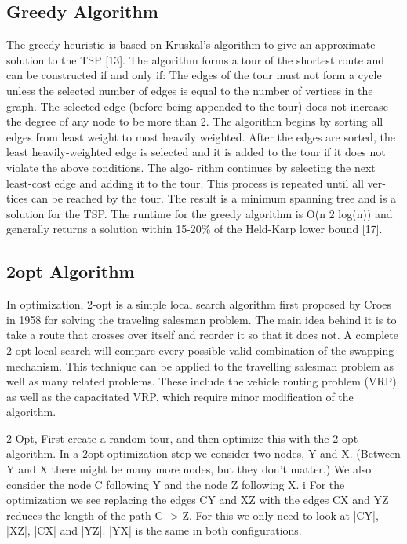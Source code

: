 \documentclass[10pt,twocolumn,letterpaper]{article}
\begin{document}
\subsection{Greedy Algorithm}
The greedy heuristic is based on Kruskal’s algorithm to
give an approximate solution to the TSP [13]. The algorithm
forms a tour of the shortest route and can be constructed if
and only if:
The edges of the tour must not form a cycle unless
the selected number of edges is equal to the number of
vertices in the graph.
The selected edge (before being appended to the tour)
does not increase the degree of any node to be more
than 2.
The algorithm begins by sorting all edges from least weight
to most heavily weighted. After the edges are sorted, the
least heavily-weighted edge is selected and it is added to the
tour if it does not violate the above conditions. The algo-
rithm continues by selecting the next least-cost edge and
adding it to the tour. This process is repeated until all ver-
tices can be reached by the tour. The result is a minimum
spanning tree and is a solution for the TSP. The runtime for
the greedy algorithm is O(n 2 log(n)) and generally returns a
solution within 15-20\% of the Held-Karp lower bound [17].

\subsection{2opt Algorithm}
In optimization, 2-opt is a simple local search algorithm first proposed
by Croes in 1958 for solving the traveling salesman problem\cite{croes1958method}.
The main idea behind it is to take a route that crosses over itself and reorder it so that it does not.
A complete 2-opt local search will compare every possible valid combination of the swapping mechanism. This technique can be applied to the travelling salesman problem as well as many related problems. These include the vehicle routing problem (VRP) as well as the capacitated VRP, which require minor modification of the algorithm.

2-Opt, First create a random tour, and then optimize this with the 2-opt
algorithm. 
In a 2opt optimization step we consider two nodes, Y and X.  (Between Y
and X there might be many more nodes, but they don't matter.) We also
consider the node C following Y and the node Z following X. i
For the optimization we see replacing the edges CY and XZ with the edges CX
and YZ reduces the length of the path  C -> Z.  For this we only need to
look at |CY|, |XZ|, |CX| and |YZ|.   |YX| is the same in both
configurations.
\end{document}
